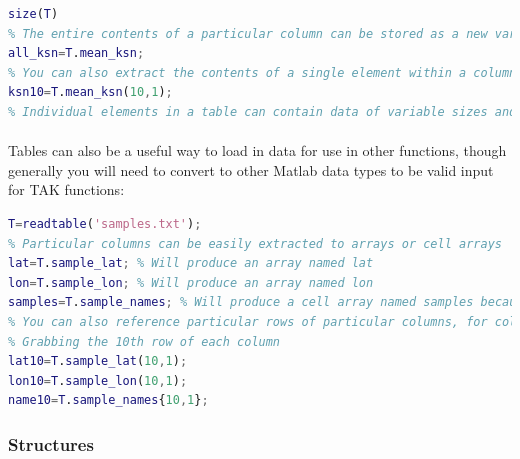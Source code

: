 \begin{lstlisting}[language=Matlab]
% You can querry the size of a table with size
size(T)
% The entire contents of a particular column can be stored as a new variable by calling the name of the table, e.g. to extract the contents of the 'mean_ksn' column which contains basin averaged normalized channel steepness data in the table output from the CompileBasinStats
all_ksn=T.mean_ksn;
% You can also extract the contents of a single element within a column, e.g., to extract the 10th element of the 'mean_ksn' column
ksn10=T.mean_ksn(10,1);
% Individual elements in a table can contain data of variable sizes and types, e.g. in the table output from CompileBasinStats, each element of the 'mean_ksn' column will have one numeric value, where as each element of the 'hyps' column will have a n x 2 array containing the hypsometry information for a particular basin
\end{lstlisting}


\paragraph{} Tables can also be a useful way to load in data for use in other functions, though generally you will need to convert to other Matlab data types to be valid input for TAK functions:

\begin{lstlisting}[language=Matlab]
% To read in a file containing mixed data, e.g. a text file with columns named 'sample_names', 'sample_lat', and 'sample_lon' and containing the names of samples as characters, the latitude of samples, and the longitude of samples respectively
T=readtable('samples.txt');
% Particular columns can be easily extracted to arrays or cell arrays
lat=T.sample_lat; % Will produce an array named lat
lon=T.sample_lon; % Will produce an array named lon
samples=T.sample_names; % Will produce a cell array named samples because the sample_names column contains characters
% You can also reference particular rows of particular columns, for columns containing numbers you reference these like arrays, for columns containing characters you reference these like cell arrays
% Grabbing the 10th row of each column
lat10=T.sample_lat(10,1);
lon10=T.sample_lon(10,1);
name10=T.sample_names{10,1};
\end{lstlisting}

\subsubsection{Structures}
